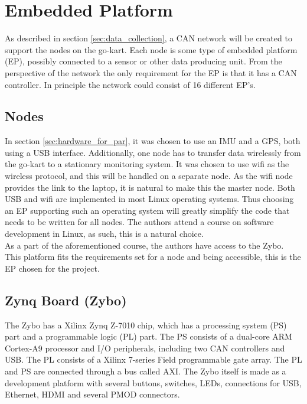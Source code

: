 
\section{Embedded Platform}\label{sec:EP}
As described in section \ref{sec:data_collection}, a CAN network will be created to support the nodes on the go-kart.
Each node is some type of embedded platform (EP), possibly connected to a sensor or other data producing unit.
From the perspective of the network the only requirement for the EP is that it has a CAN controller.
In principle the network could consist of 16 different EP's.
\subsection{Nodes}
In section \ref{sec:hardware_for_par}, it was chosen to use an IMU and a GPS, both using a USB interface.
Additionally, one node has to transfer data wirelessly from the go-kart to a stationary monitoring system.
It was chosen to use wifi as the wireless protocol, and this will be handled on a separate node.
As the wifi node provides the link to the laptop, it is natural to make this the master node.
Both USB and wifi are implemented in most Linux operating systems.
Thus choosing an EP supporting such an operating system will greatly simplify the code that needs to be written for all nodes.
The authors attend a course on software development in Linux, as such, this is a natural choice.
\\
As a part of the aforementioned course, the authors have access to the Zybo.
This platform fits the requirements set for a node and being accessible, this is the EP chosen for the project.

\subsection{Zynq Board (Zybo)}
The Zybo has a Xilinx Zynq Z-7010 chip, which has a processing system (PS) part and a programmable logic (PL) part.
The PS consists of a dual-core ARM Cortex-A9 processor and I/O peripherals, including two CAN controllers and USB.
The PL consists of a Xilinx 7-series Field programmable gate array. 
The PL and PS are connected through a bus called AXI.
The Zybo itself is made as a development platform with several buttons, switches, LEDs, connections for USB, Ethernet, HDMI and several PMOD connectors.
